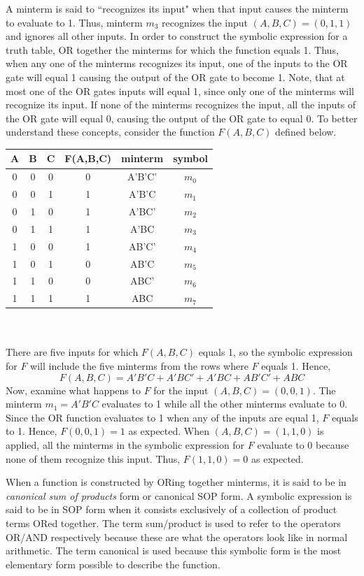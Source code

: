 A minterm is said to ``recognizes its input" when that input
causes the minterm to evaluate to 1.  Thus, minterm $m_3$ recognizes
the input $(A,B,C)=(0,1,1)$ and ignores all other inputs.  In order 
to construct the symbolic expression for a truth table, OR together 
the minterms for which the function equals 1. Thus, when any one of 
the minterms recognizes its input, one of the inputs to the OR gate 
will equal 1 causing the output of the OR gate to become 1.  Note, 
that at most one of the OR gates inputs will equal 1, since only one 
of the minterms will recognize its input.  If none of the minterms 
recognizes the input, all the inputs of the OR gate will equal 0, 
causing the output of the OR gate to equal 0.  To better understand
these concepts, consider the function $F(A,B,C)$ defined below.

\begin{tabular}{c|c|c||c|c|c}
A & B & C & F(A,B,C)	& minterm & symbol	\\ \hline
0 & 0 & 0 & 0		& A'B'C'  & $m_0$	\\ \hline
0 & 0 & 1 & 1		& A'B'C   & $m_1$	\\ \hline
0 & 1 & 0 & 1		& A'BC'   & $m_2$	\\ \hline
0 & 1 & 1 & 1		& A'BC    & $m_3$	\\ \hline
1 & 0 & 0 & 1		& AB'C'   & $m_4$	\\ \hline
1 & 0 & 1 & 0		& AB'C    & $m_5$	\\ \hline
1 & 1 & 0 & 0		& ABC'    & $m_6$	\\ \hline
1 & 1 & 1 & 1		& ABC     & $m_7$	\\ 
\end{tabular}
\\ \\
There are five inputs for which $F(A,B,C)$ equals 1, so the symbolic
expression for $F$ will include the five minterms from the rows where
$F$ equals 1.  Hence, 
$$F(A,B,C) =  A'B'C + A'BC' + A'BC + AB'C' + ABC$$
Now, examine what happens to $F$ for the input $(A,B,C)=(0,0,1)$.  
The minterm $m_1=A'B'C$ evaluates to 1 while all the other minterms 
evaluate to 0.  Since the OR function evaluates to 1 when any of 
the inputs are equal 1, $F$ equals to 1. Hence, $F(0,0,1)=1$ as
expected.  When $(A,B,C)=(1,1,0)$ is applied, all the
minterms in the symbolic expression for $F$ evaluate to 0 because
none of them recognize this input.  Thus, $F(1,1,0)=0$ as expected.

When a function is constructed by ORing together minterms, it is
said to be in {\it canonical sum of products} 
 form or canonical SOP form.  A symbolic
expression is said to be in SOP form when it consists
exclusively of a collection of product terms ORed together.  
The term sum/product is used to refer to the operators OR/AND 
respectively because these are what the operators look like in 
normal arithmetic. The term canonical is used because this 
symbolic form is the most elementary form possible to describe 
the function.

